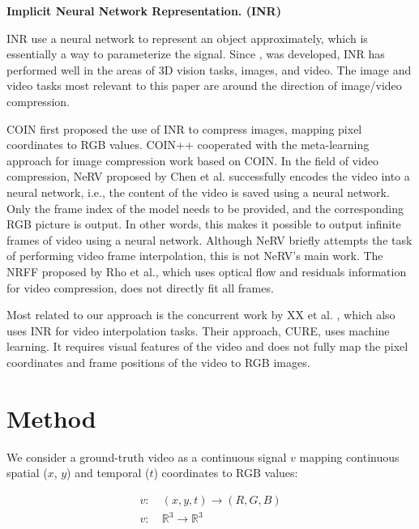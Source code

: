 \documentclass{article}
\begin{document}
\textbf{Implicit Neural Network Representation. (INR)}

INR use a neural network to represent an object approximately, which is essentially a way to parameterize the signal.
Since \cite{mildenhall2020nerf}, \cite{sitzmann2020implicit} was developed, INR has performed well in the areas of 3D vision tasks, images, and video.
The image and video tasks most relevant to this paper are around the direction of image/video compression.

COIN \cite{dupont2021coin} first proposed the use of INR to compress images, mapping pixel coordinates to RGB values.
COIN++ \cite{dupont2022coin++} cooperated with the meta-learning approach for image compression work based on COIN.
In the field of video compression, NeRV \cite{chen2021nerv} proposed by Chen et al. successfully encodes the video into a neural network, i.e., the content of the video is saved using a neural network.
Only the frame index of the model needs to be provided, and the corresponding RGB picture is output.
In other words, this makes it possible to output infinite frames of video using a neural network.
Although NeRV briefly attempts the task of performing video frame interpolation, this is not NeRV's main work.
The NRFF \cite{rho2022neural} proposed by Rho et al., which uses optical flow and residuals information for video compression, does not directly fit all frames.

Most related to our approach is the concurrent work by XX et al. \cite{shangguan2022learning}, which also uses INR for video interpolation tasks.
Their approach, CURE, uses machine learning.
It requires visual features of the video and does not fully map the pixel coordinates and frame positions of the video to RGB images.


\section{Method}

We consider a ground-truth video as a continuous signal $v$ mapping continuous spatial ($x$, $y$) and temporal ($t$) coordinates to RGB values:

\begin{equation}
\begin{aligned}
v:& \: (x, y, t) \rightarrow (R, G, B) \\
v:& \: \mathbb{R}^3 \rightarrow \mathbb{R}^3
\end{aligned}
\end{equation}
\end{document}
